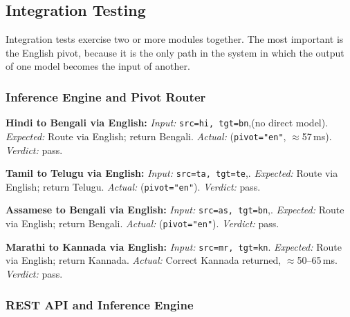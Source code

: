 \subsection{Integration Testing}
\label{subsec:integrationtest}

Integration tests exercise two or more modules together. The most important is
the English pivot, because it is the only path in the system in which the output
of one model becomes the input of another.

\subsubsection{Inference Engine and Pivot Router}

\begin{bullets}
\item \textbf{Hindi to Bengali via English:} \emph{Input:} \texttt{src=hi, tgt=bn},\newline {}\newline (no direct model). \emph{Expected:} Route via English; return Bengali. \emph{Actual:} \newline (\texttt{pivot="en"}, $\approx$57\,ms). \emph{Verdict:} pass.
\item \textbf{Tamil to Telugu via English:} \emph{Input:} \texttt{src=ta, tgt=te},\newline {}. \emph{Expected:} Route via English; return Telugu. \emph{Actual:} \newline (\texttt{pivot="en"}). \emph{Verdict:} pass.
\item \textbf{Assamese to Bengali via English:} \emph{Input:} \texttt{src=as, tgt=bn},\newline {}. \emph{Expected:} Route via English; return Bengali. \emph{Actual:} \newline (\texttt{pivot="en"}). \emph{Verdict:} pass.
\item \textbf{Marathi to Kannada via English:} \emph{Input:} \texttt{src=mr, tgt=kn}. \emph{Expected:} Route via English; return Kannada. \emph{Actual:} Correct Kannada returned, $\approx$50--65\,ms. \emph{Verdict:} pass.
\end{bullets}

\subsubsection{REST API and Inference Engine}

